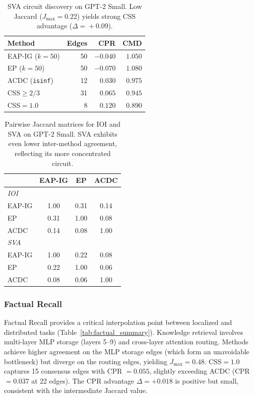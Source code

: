 \documentclass[11pt,a4paper]{article}
\newcommand{\css}{\textsc{CSS}}
\begin{document}
\begin{table}[t]
\centering
\small
\begin{tabular}{lrrr}
\toprule
\textbf{Method} & \textbf{Edges} & \textbf{CPR} & \textbf{CMD} \\
\midrule
EAP-IG ($k\!=\!50$) & 50 & $-0.040$ & $1.050$ \\
EP ($k\!=\!50$) & 50 & $-0.070$ & $1.080$ \\
ACDC (\texttt{isinf}) & 12 & $0.030$ & $0.975$ \\
\midrule
\css{}$\ge 2/3$ & 31 & $0.065$ & $0.945$ \\
\css{}$= 1.0$ & 8 & $\mathbf{0.120}$ & $0.890$ \\
\bottomrule
\end{tabular}
\caption{SVA circuit discovery on GPT-2 Small. Low Jaccard ($J_{\max}\!=\!0.22$) yields strong CSS advantage ($\Delta\!=\!+0.09$).}
\label{tab:sva_summary}
\end{table}

\begin{table}[t]
\centering
\small
\begin{tabular}{lccc}
\toprule
& \textbf{EAP-IG} & \textbf{EP} & \textbf{ACDC} \\
\midrule
\multicolumn{4}{l}{\emph{IOI}} \\
EAP-IG & 1.00 & 0.31 & 0.14 \\
EP & 0.31 & 1.00 & 0.08 \\
ACDC & 0.14 & 0.08 & 1.00 \\
\midrule
\multicolumn{4}{l}{\emph{SVA}} \\
EAP-IG & 1.00 & 0.22 & 0.08 \\
EP & 0.22 & 1.00 & 0.06 \\
ACDC & 0.08 & 0.06 & 1.00 \\
\bottomrule
\end{tabular}
\caption{Pairwise Jaccard matrices for IOI and SVA on GPT-2 Small. SVA exhibits even lower inter-method agreement, reflecting its more concentrated circuit.}
\label{tab:jaccard_matrix}
\end{table}

\subsubsection{Factual Recall}

Factual Recall provides a critical interpolation point between localized and distributed tasks (Table~\ref{tab:factual_summary}).
Knowledge retrieval involves multi-layer MLP storage (layers 5--9) and cross-layer attention routing.
Methods achieve higher agreement on the MLP storage edges (which form an unavoidable bottleneck) but diverge on the routing edges, yielding $J_{\max}\!=\!0.48$.
\css{}$=1.0$ captures 15 consensus edges with CPR $= 0.055$, slightly exceeding ACDC (CPR $= 0.037$ at 22 edges).
The CPR advantage $\Delta = +0.018$ is positive but small, consistent with the intermediate Jaccard value.
\end{document}
